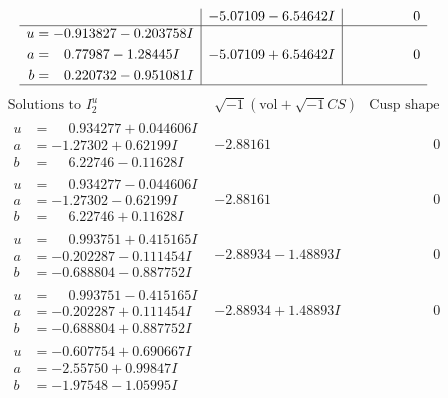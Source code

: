 \documentclass[1p]{elsarticle_modified}
\theoremstyle{definition}
\newcommand{\I}{\sqrt{-1}}
\begin{document}
$$\begin{array}{c|c|c}
 & -5.07109 - 6.54642 I & \phantom{-0.000000 } 0 \\ \hline\begin{aligned}
u &= -0.913827 - 0.203758 I \\
a &= \phantom{-}0.77987 - 1.28445 I \\
b &= \phantom{-}0.220732 - 0.951081 I\end{aligned}
 & -5.07109 + 6.54642 I & \phantom{-0.000000 } 0\\
 \hline 
 \end{array}$$\newpage$$\begin{array}{c|c|c}  
\text{Solutions to }I^u_{2}& \I (\text{vol} + \sqrt{-1}CS) & \text{Cusp shape}\\
 \hline 
\begin{aligned}
u &= \phantom{-}0.934277 + 0.044606 I \\
a &= -1.27302 + 0.62199 I \\
b &= \phantom{-}6.22746 - 0.11628 I\end{aligned}
 & -2.88161\phantom{ +0.000000I} & \phantom{-0.000000 } 0 \\ \hline\begin{aligned}
u &= \phantom{-}0.934277 - 0.044606 I \\
a &= -1.27302 - 0.62199 I \\
b &= \phantom{-}6.22746 + 0.11628 I\end{aligned}
 & -2.88161\phantom{ +0.000000I} & \phantom{-0.000000 } 0 \\ \hline\begin{aligned}
u &= \phantom{-}0.993751 + 0.415165 I \\
a &= -0.202287 - 0.111454 I \\
b &= -0.688804 - 0.887752 I\end{aligned}
 & -2.88934 - 1.48893 I & \phantom{-0.000000 } 0 \\ \hline\begin{aligned}
u &= \phantom{-}0.993751 - 0.415165 I \\
a &= -0.202287 + 0.111454 I \\
b &= -0.688804 + 0.887752 I\end{aligned}
 & -2.88934 + 1.48893 I & \phantom{-0.000000 } 0 \\ \hline\begin{aligned}
u &= -0.607754 + 0.690667 I \\
a &= -2.55750 + 0.99847 I \\
b &= -1.97548 - 1.05995 I\end{aligned}

\end{array}$$
\end{document}
